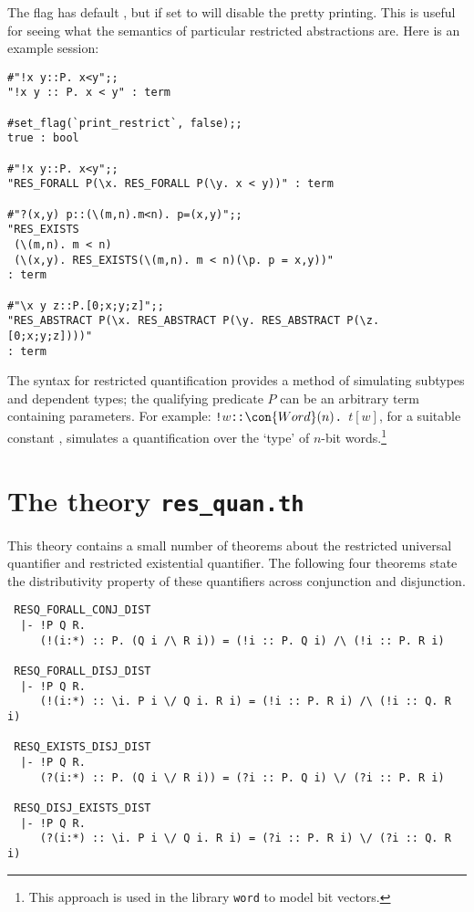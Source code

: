 The flag  has default , but if set to
 will
disable the pretty printing. This is useful for seeing what the
semantics of particular restricted abstractions are.
Here is an example session:

\setcounter{sessioncount}{1}
\begin{session}\begin{verbatim}
#"!x y::P. x<y";;
"!x y :: P. x < y" : term

#set_flag(`print_restrict`, false);;
true : bool

#"!x y::P. x<y";;
"RES_FORALL P(\x. RES_FORALL P(\y. x < y))" : term

#"?(x,y) p::(\(m,n).m<n). p=(x,y)";;
"RES_EXISTS
 (\(m,n). m < n)
 (\(x,y). RES_EXISTS(\(m,n). m < n)(\p. p = x,y))"
: term

#"\x y z::P.[0;x;y;z]";;
"RES_ABSTRACT P(\x. RES_ABSTRACT P(\y. RES_ABSTRACT P(\z. [0;x;y;z])))"
: term
\end{verbatim}\end{session}

The syntax for restricted quantification provides a method of
simulating subtypes and dependent types; the qualifying predicate $P$ can be
an arbitrary term containing parameters. For example:
{\small\verb|!|}$w${\small\verb|::|}$\con{Word}(n)${\small\verb|. |}$t[w]$,
for a suitable constant , simulates a quantification over the
`type' of $n$-bit words.\footnote{This approach is used in the library
{\tt word} to model bit vectors.}

\section{The theory {\tt res\_quan.{}th}}

This theory contains a small number of theorems about the restricted
universal quantifier and restricted existential quantifier.
The following four theorems state the distributivity property of these
quantifiers across conjunction and disjunction.
\begin{verbatim}
 RESQ_FORALL_CONJ_DIST
  |- !P Q R.
     (!(i:*) :: P. (Q i /\ R i)) = (!i :: P. Q i) /\ (!i :: P. R i)

 RESQ_FORALL_DISJ_DIST
  |- !P Q R.
     (!(i:*) :: \i. P i \/ Q i. R i) = (!i :: P. R i) /\ (!i :: Q. R i)

 RESQ_EXISTS_DISJ_DIST
  |- !P Q R.
     (?(i:*) :: P. (Q i \/ R i)) = (?i :: P. Q i) \/ (?i :: P. R i)

 RESQ_DISJ_EXISTS_DIST
  |- !P Q R.
     (?(i:*) :: \i. P i \/ Q i. R i) = (?i :: P. R i) \/ (?i :: Q. R i)
\end{verbatim}

